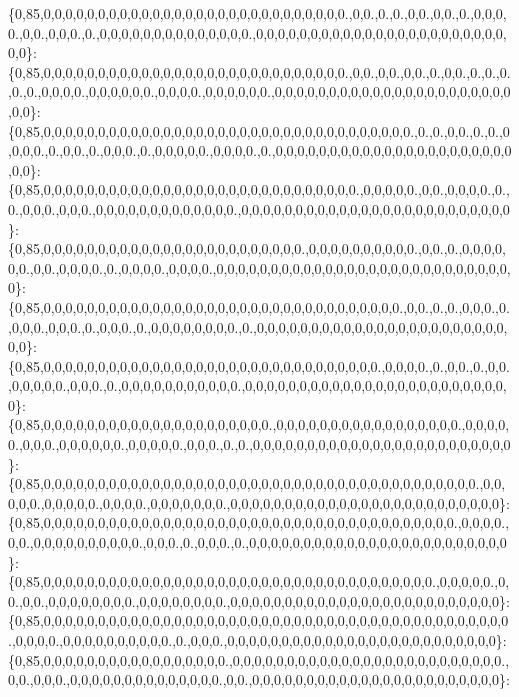\{0,85,0,0,0,0,0,0,0,0,0,0,0,0,0,0,0,0,0,0,0,0,0,0,0,0,0,0,0,0.,0,0.,0.,0.,0,0.,0,0.,0.,0,0,0,0.,0,0.,0,0,0.,0.,0,0,0,0,0,0,0,0,0,0,0,0,0,0.,0,0,0,0,0,0,0,0,0,0,0,0,0,0,0,0,0,0,0,0,0,0,0,0,0\}\+: \{0,85,0,0,0,0,0,0,0,0,0,0,0,0,0,0,0,0,0,0,0,0,0,0,0,0,0,0,0,0.,0,0.,0,0.,0,0.,0.,0,0.,0.,0.,0.,0.,0.,0,0,0,0.,0,0,0,0,0,0.,0,0,0,0.,0,0,0,0,0,0.,0,0,0,0,0,0,0,0,0,0,0,0,0,0,0,0,0,0,0,0,0,0,0,0\}\+: \{0,85,0,0,0,0,0,0,0,0,0,0,0,0,0,0,0,0,0,0,0,0,0,0,0,0,0,0,0,0,0,0,0,0,0,0.,0.,0.,0,0.,0.,0.,0,0,0,0.,0.,0,0.,0.,0,0,0.,0.,0,0,0,0,0.,0,0,0,0.,0.,0,0,0,0,0,0,0,0,0,0,0,0,0,0,0,0,0,0,0,0,0,0,0,0\}\+: \{0,85,0,0,0,0,0,0,0,0,0,0,0,0,0,0,0,0,0,0,0,0,0,0,0,0,0,0,0,0,0.,0,0,0,0,0.,0,0.,0,0,0,0.,0.,0.,0,0,0.,0,0,0.,0,0,0,0,0,0,0,0,0,0,0,0,0.,0,0,0,0,0,0,0,0,0,0,0,0,0,0,0,0,0,0,0,0,0,0,0,0,0\}\+: \{0,85,0,0,0,0,0,0,0,0,0,0,0,0,0,0,0,0,0,0,0,0,0,0,0,0.,0,0,0,0,0,0,0,0,0,0.,0,0.,0.,0,0,0,0,0,0.,0,0.,0,0,0,0.,0.,0,0,0,0.,0,0,0,0.,0,0,0,0,0,0,0,0,0,0,0,0,0,0,0,0,0,0,0,0,0,0,0,0,0,0,0,0\}\+: \{0,85,0,0,0,0,0,0,0,0,0,0,0,0,0,0,0,0,0,0,0,0,0,0,0,0,0,0,0,0,0,0,0,0,0.,0,0.,0.,0.,0,0,0.,0.,0,0,0.,0,0,0.,0.,0,0,0.,0.,0,0,0,0,0,0,0,0.,0.,0,0,0,0,0,0,0,0,0,0,0,0,0,0,0,0,0,0,0,0,0,0,0,0,0\}\+: \{0,85,0,0,0,0,0,0,0,0,0,0,0,0,0,0,0,0,0,0,0,0,0,0,0,0,0,0,0,0,0,0,0.,0,0,0,0.,0.,0,0.,0.,0,0.,0,0,0,0,0.,0,0,0.,0.,0,0,0,0,0,0,0,0,0,0,0.,0,0,0,0,0,0,0,0,0,0,0,0,0,0,0,0,0,0,0,0,0,0,0,0,0\}\+: \{0,85,0,0,0,0,0,0,0,0,0,0,0,0,0,0,0,0,0,0,0,0,0.,0,0,0,0,0,0,0,0,0,0,0,0,0,0,0,0,0.,0,0,0,0,0.,0,0,0.,0,0,0,0,0,0.,0,0,0,0,0.,0,0,0.,0.,0.,0,0,0,0,0,0,0,0,0,0,0,0,0,0,0,0,0,0,0,0,0,0,0,0\}\+: \{0,85,0,0,0,0,0,0,0,0,0,0,0,0,0,0,0,0,0,0,0,0,0,0,0,0,0,0,0,0,0,0,0,0,0,0,0,0,0,0,0,0.,0,0,0,0,0.,0,0,0,0,0.,0,0,0,0.,0,0,0,0,0,0,0.,0,0,0,0,0,0,0,0,0,0,0,0,0,0,0,0,0,0,0,0,0,0,0,0,0\}\+: \{0,85,0,0,0,0,0,0,0,0,0,0,0,0,0,0,0,0,0,0,0,0,0,0,0,0,0,0,0,0,0,0,0,0,0,0,0,0,0,0.,0,0,0,0.,0,0.,0,0,0,0,0,0,0,0,0,0.,0,0,0.,0.,0,0,0.,0.,0,0,0,0,0,0,0,0,0,0,0,0,0,0,0,0,0,0,0,0,0,0,0,0\}\+: \{0,85,0,0,0,0,0,0,0,0,0,0,0,0,0,0,0,0,0,0,0,0,0,0,0,0,0,0,0,0,0,0,0,0,0,0,0,0.,0,0,0,0,0.,0,0.,0,0.,0,0,0,0,0,0,0,0.,0,0,0,0,0,0,0,0.,0,0,0,0,0,0,0,0,0,0,0,0,0,0,0,0,0,0,0,0,0,0,0,0,0\}\+: \{0,85,0,0,0,0,0,0,0,0,0,0,0,0,0,0,0,0,0,0,0,0,0,0,0,0,0,0,0,0,0,0,0,0,0,0,0,0,0,0,0,0,0,0,0.,0,0,0,0.,0,0,0,0,0,0,0,0,0,0.,0.,0,0,0.,0,0,0,0,0,0,0,0,0,0,0,0,0,0,0,0,0,0,0,0,0,0,0,0,0\}\+: \{0,85,0,0,0,0,0,0,0,0,0,0,0,0,0,0,0,0,0.,0,0,0,0,0,0,0,0,0,0,0,0,0,0,0,0,0,0,0,0,0,0,0,0,0.,0,0.,0,0,0.,0,0,0,0,0,0,0,0,0,0,0,0,0,0.,0,0.,0,0,0,0,0,0,0,0,0,0,0,0,0,0,0,0,0,0,0,0,0,0,0\}\+: 